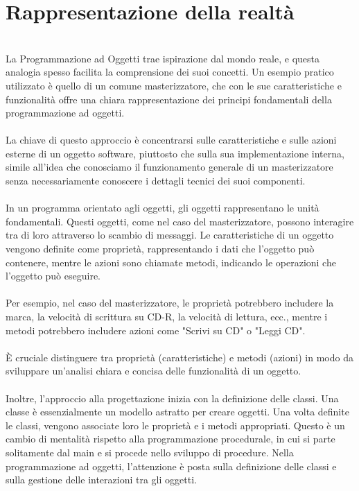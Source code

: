\documentclass{report}
\begin{document}
\section{Rappresentazione della realtà}
\\
La Programmazione ad Oggetti trae ispirazione dal mondo reale, e questa analogia spesso facilita la comprensione dei suoi concetti. Un esempio pratico utilizzato è quello di un comune masterizzatore, che con le sue caratteristiche e funzionalità offre una chiara rappresentazione dei principi fondamentali della programmazione ad oggetti.
\\
\\
La chiave di questo approccio è concentrarsi sulle caratteristiche e sulle azioni esterne di un oggetto software, piuttosto che sulla sua implementazione interna, simile all'idea che conosciamo il funzionamento generale di un masterizzatore senza necessariamente conoscere i dettagli tecnici dei suoi componenti.
\\
\\
In un programma orientato agli oggetti, gli oggetti rappresentano le unità fondamentali. Questi oggetti, come nel caso del masterizzatore, possono interagire tra di loro attraverso lo scambio di messaggi. Le caratteristiche di un oggetto vengono definite come proprietà, rappresentando i dati che l'oggetto può contenere, mentre le azioni sono chiamate metodi, indicando le operazioni che l'oggetto può eseguire.
\\
\\
Per esempio, nel caso del masterizzatore, le proprietà potrebbero includere la marca, la velocità di scrittura su CD-R, la velocità di lettura, ecc., mentre i metodi potrebbero includere azioni come "Scrivi su CD" o "Leggi CD".
\\
\\
È cruciale distinguere tra proprietà (caratteristiche) e metodi (azioni) in modo da sviluppare un'analisi chiara e concisa delle funzionalità di un oggetto.
\\
\\
Inoltre, l'approccio alla progettazione inizia con la definizione delle classi. Una classe è essenzialmente un modello astratto per creare oggetti. Una volta definite le classi, vengono associate loro le proprietà e i metodi appropriati. Questo è un cambio di mentalità rispetto alla programmazione procedurale, in cui si parte solitamente dal main e si procede nello sviluppo di procedure. Nella programmazione ad oggetti, l'attenzione è posta sulla definizione delle classi e sulla gestione delle interazioni tra gli oggetti.
\\
\end{document}
